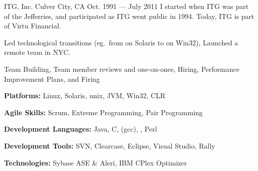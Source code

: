 \begin{cventries}
    {ITG, Inc.} %
    {Culver City, CA} %
    {Oct. 1991 --- July 2011} %
    {I started when ITG was part of the Jefferries, and participated as ITG went public in 1994. Today, ITG is part of Virtu Financial.}

    {} %
    {} %
    {} %
    {\vspace{-0.5mm}
    \begin{cvitems} %
      \item {Led technological transitions (eg.\ from \CC{} on Solaris to \CS{} on Win32), Launched a remote team in NYC.}
      \item {Team Building, Team member reviews and one-on-ones, Hiring, Performance Improvement Plans, and Firing}
    \end{cvitems}
    }

    {} %
    {} %
    {} %
    {\vspace{-0.5mm}
    \begin{cvitems}
      \item {\textbf{Platforms:} Linux, Solaris, unix, JVM, Win32, CLR}
      \item {\textbf{Agile Skills:} Scrum, Extreme Programming, Pair Programming}
      \item {\textbf{Development Languages:} Java, C, \CC{} (gcc), \CS{}, Perl}
      \item {\textbf{Development Tools:} SVN, Clearcase, Eclipse, Visual Studio, Rally}
      \item {\textbf{Technologies:} Sybase ASE \& Aleri, IBM CPlex Optimizer}
    \end{cvitems}  
    }
\end{cventries}


